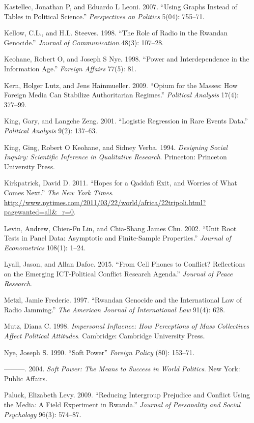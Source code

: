 \documentclass[11pt,article,oneside]{memoir}
\begin{document}
Kastellec, Jonathan P, and Eduardo L Leoni. 2007. ``Using Graphs Instead
of Tables in Political Science.'' \emph{Perspectives on Politics} 5(04):
755--71.

Kellow, C.L., and H.L. Steeves. 1998. ``The Role of Radio in the Rwandan
Genocide.'' \emph{Journal of Communication} 48(3): 107--28.

Keohane, Robert O, and Joseph S Nye. 1998. ``Power and Interdependence
in the Information Age.'' \emph{Foreign Affairs} 77(5): 81.

Kern, Holger Lutz, and Jens Hainmueller. 2009. ``Opium for the Masses:
How Foreign Media Can Stabilize Authoritarian Regimes.'' \emph{Political
Analysis} 17(4): 377--99.

King, Gary, and Langche Zeng. 2001. ``Logistic Regression in Rare Events
Data.'' \emph{Political Analysis} 9(2): 137--63.

King, Ging, Robert O Keohane, and Sidney Verba. 1994. \emph{Designing
Social Inquiry: Scientific Inference in Qualitative Research}.
Princeton: Princeton University Press.

Kirkpatrick, David D. 2011. ``Hopes for a Qaddafi Exit, and Worries of
What Comes Next.'' \emph{The New York Times}.
\url{http://www.nytimes.com/2011/03/22/world/africa/22tripoli.html?pagewanted=all\&_r=0}.

Levin, Andrew, Chien-Fu Lin, and Chia-Shang James Chu. 2002. ``Unit Root
Tests in Panel Data: Asymptotic and Finite-Sample Properties.''
\emph{Journal of Econometrics} 108(1): 1--24.

Lyall, Jason, and Allan Dafoe. 2015. ``From Cell Phones to Conflict?
Reflections on the Emerging ICT-Political Conflict Research Agenda.''
\emph{Journal of Peace Research}.

Metzl, Jamie Frederic. 1997. ``Rwandan Genocide and the International
Law of Radio Jamming.'' \emph{The American Journal of International Law}
91(4): 628.

Mutz, Diana C. 1998. \emph{Impersonal Influence: How Perceptions of Mass
Collectives Affect Political Attitudes}. Cambridge: Cambridge University
Press.

Nye, Joseph S. 1990. ``Soft Power'' \emph{Foreign Policy} (80): 153--71.

---------. 2004. \emph{Soft Power: The Means to Success in World
Politics}. New York: Public Affairs.

Paluck, Elizabeth Levy. 2009. ``Reducing Intergroup Prejudice and
Conflict Using the Media: A Field Experiment in Rwanda.'' \emph{Journal
of Personality and Social Psychology} 96(3): 574--87.
\end{document}
